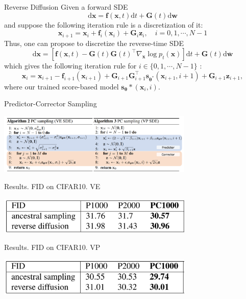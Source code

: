 \documentclass[xcolor=dvipsnames]{beamer}
\begin{document}
    \begin{frame}{Reverse Diffusion}
        Given a forward SDE
$$
\mathrm{d} \mathbf{x}=\mathbf{f}(\mathbf{x}, t) \mathrm{d} t+\mathbf{G}(t) \mathrm{d} \mathbf{w}
$$
and suppose the following iteration rule is a discretization of it:
$$
\mathbf{x}_{i+1}=\mathbf{x}_i+\mathbf{f}_i\left(\mathbf{x}_i\right)+\mathbf{G}_i \mathbf{z}_i, \quad i=0,1, \cdots, N-1
$$
Thus, one can propose to discretize the reverse-time SDE
$$
\mathrm{d} \mathbf{x}=\left[\mathbf{f}(\mathbf{x}, t)-\mathbf{G}(t) \mathbf{G}(t)^{\top} \nabla_{\mathbf{x}} \log p_t(\mathbf{x})\right] \mathrm{d} t+\mathbf{G}(t) \mathrm{d} \overline{\mathbf{w}}
$$
which gives the following iteration rule for $i \in\{0,1, \cdots, N-1\}$ :
$$
\mathbf{x}_i=\mathbf{x}_{i+1}-\mathbf{f}_{i+1}\left(\mathbf{x}_{i+1}\right)+\mathbf{G}_{i+1} \mathbf{G}_{i+1}^{\top} \mathbf{s}_{\boldsymbol{\theta}^*}\left(\mathbf{x}_{i+1}, i+1\right)+\mathbf{G}_{i+1} \mathbf{z}_{i+1},
$$
where our trained score-based model $\mathbf{s}_{\boldsymbol{\theta}} *\left(\mathbf{x}_i, i\right)$.
    \end{frame}

    \begin{frame}{Predictor-Corrector Sampling}
        \begin{center}
            \includegraphics[width=0.7\textwidth]{pics/PC.png}
        \end{center}
    \end{frame}

    \begin{frame}{Results. FID on CIFAR10. VE}            
        \begin{center}
            \includegraphics[width=0.7\textwidth]{pics/VE_table.png}
        \end{center}
    \end{frame}


    \begin{frame}{Results. FID on CIFAR10. VP}            
        \begin{center}
            \includegraphics[width=0.7\textwidth]{pics/VP_table.png}
        \end{center}
    \end{frame}
\end{document}
